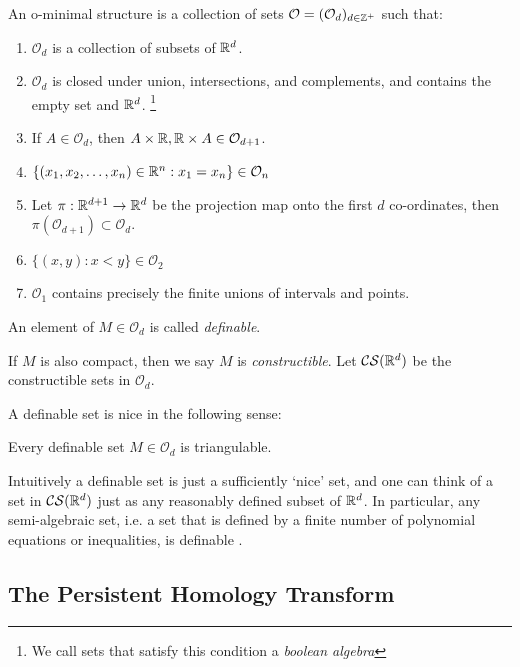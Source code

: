 \begin{definition}\label{def:constructible_sets}

An o-minimal structure is a collection of sets \(\mathcal{O}=(\mathcal{O}_d)_{d\in \mathbb{Z}^+}\) such that:

\begin{enumerate}
    \item \(\mathcal{O}_d\) is a collection of subsets of \(\mathbb{R}^d\). 
    \item \(\mathcal{O}_d\) is closed under union, intersections, and complements, and contains the empty set and \(\mathbb{R}^d\). \footnote{We call sets that satisfy this condition a \textit{boolean algebra}}
    \item If \(A\in \mathcal{O}_d\), then \(A\times \mathbb{R}, \mathbb{R}\times A\in \mathcal{O}_{d+1}\). 
    \item \(\{(x_1,x_2,\dots,x_n)\in \mathbb{R}^n : x_1=x_n\}\in \mathcal{O}_n\)
    \item Let \(\pi:\mathbb{R}^{d+1}\rightarrow \mathbb{R}^d\) be the projection map onto the first \(d\) co-ordinates, then \(\pi(\mathcal{O}_{d+1})\subset \mathcal{O}_d\). 
    \item \(\{(x,y):x<y\}\in\mathcal{O}_2\)
    \item \(\mathcal{O}_1\) contains precisely the finite unions of intervals and points. 
\end{enumerate}

An element of \(M\in \mathcal{O}_d\) is called \textit{definable}. 

If \(M\) is also compact, then we say \(M\) is \textit{constructible}. Let \(\mathcal{CS}(\mathbb{R}^d)\) be the constructible sets in \(\mathcal{O}_d\).
\end{definition}

A definable set is nice in the following sense: 

\begin{theorem}
    Every definable set \(M\in \mathcal{O}_d\) is triangulable. 
\end{theorem}

Intuitively a definable set is just a sufficiently `nice' set, and one can think of a set in \(\mathcal{CS}(\mathbb{R}^d)\) just as any reasonably defined subset of \(\mathbb{R}^d\). In particular, any semi-algebraic set, i.e. a set that is defined by a finite number of polynomial equations or inequalities, is definable \cite{dries1998}. 


\subsection{The Persistent Homology Transform}

